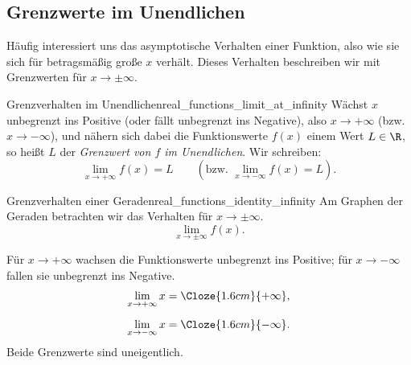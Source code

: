 \par\noindent\begin{minipage}{\linewidth}
\subsection{Grenzwerte im Unendlichen}
\label{subsec:real_functions_infinite_limits}
Häufig interessiert uns das asymptotische Verhalten einer Funktion,
also wie sie sich für betragsmäßig große $x$ verhält.
Dieses Verhalten beschreiben wir mit Grenzwerten für $x\to\pm\infty$.
\begin{DefinitionBox}{Grenzverhalten im Unendlichen}{real_functions_limit_at_infinity}
  Wächst $x$ unbegrenzt ins Positive (oder fällt unbegrenzt ins Negative),
  also $x\to+\infty$ (bzw. $x\to-\infty$), und nähern sich dabei die
  Funktionswerte $f(x)$ einem Wert $L\in\R$, so heißt $L$ der
  \emph{Grenzwert von $f$ im Unendlichen}. Wir schreiben:
  \[
    \lim_{x\to+\infty}f(x)=L
    \qquad\left(\text{bzw. }\lim_{x\to-\infty}f(x)=L\right).
  \]
\end{DefinitionBox}
\begin{ExampleBox}[before skip=0.3\baselineskip]{Grenzverhalten einer Geraden}{real_functions_identity_infinity}
  Am Graphen der Geraden betrachten wir das Verhalten für $x\to\pm\infty$.
  \[
    \lim_{x\to\pm\infty}f(x).
  \]
  \par\smallskip\noindent
  \begin{minipage}[c]{0.47\linewidth}
    Für $x\to+\infty$ wachsen die Funktionswerte unbegrenzt ins Positive;
    für $x\to-\infty$ fallen sie unbegrenzt ins Negative.
    \[
      \begin{aligned}
        \lim_{x\to+\infty}x&=\Cloze{1.6cm}{+\infty},\\[0.5em]
        \lim_{x\to-\infty}x&=\Cloze{1.6cm}{-\infty}.
      \end{aligned}
    \]
    Beide Grenzwerte sind uneigentlich.
  \end{minipage}\hfill
  \begin{minipage}[c]{0.47\linewidth}
    \centering
  \end{minipage}
\end{ExampleBox}
\end{minipage}
